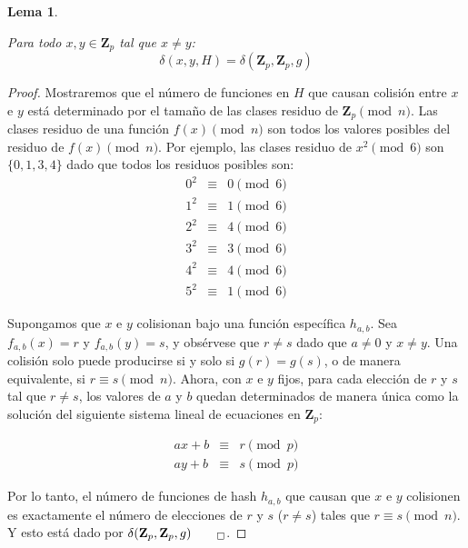 \documentclass[a4paper,10pt, oneside]{article}
\newtheorem{lemma}[theorem]{Lema}
\begin{document}
\begin{lemma}\label{lemma:pair_colisions}

	Para todo $x,y \in \mathbf{Z}_p$ tal que $x \neq y$:
	\begin{equation}
		\delta(x,y,H) = \delta(\mathbf{Z}_p,\mathbf{Z}_p,g)
	\end{equation}
\end{lemma}
\begin{proof}
	Mostraremos que el número de funciones en $H$ que causan colisión entre $x$ e $y$ está determinado por el tamaño de las clases residuo de $\mathbf{Z}_p \pmod{n}$. Las clases residuo de una función $f(x) \pmod{n}$ son todos los valores posibles del residuo de $f(x) \pmod{n}$. Por ejemplo, las clases residuo de $x^2 \pmod{6}$ son $\{ 0, 1, 3, 4 \}$ dado que todos los residuos posibles son:
	\begin{equation}
		\begin{array}{lll}
			0^2 & \equiv & 0 \pmod{6}\\		
			1^2 & \equiv & 1 \pmod{6}\\	
			2^2 & \equiv & 4 \pmod{6}\\	
			3^2 & \equiv & 3 \pmod{6}\\	
			4^2 & \equiv & 4 \pmod{6}\\	
			5^2 & \equiv & 1 \pmod{6}
		\end{array}
	\end{equation}
	
	Supongamos que $x$ e $y$ colisionan bajo una función específica $h_{a,b}$. Sea $f_{a,b}(x) = r$ y $f_{a,b}(y) = s$, y obsérvese que $r\neq s$ dado que $a \neq 0$ y $x \neq y$. Una colisión solo puede producirse si y solo si $g(r) = g(s)$, o de manera equivalente, si $r \equiv s \pmod{n}$. Ahora, con $x$ e $y$ fijos, para cada elección de $r$ y $s$ tal que $r \neq s$, los valores de $a$ y $b$ quedan determinados de manera única como la solución del siguiente sistema lineal de ecuaciones en $\mathbf{Z}_p$:
	
	\begin{equation}
		\begin{array}{lll}
			ax+b & \equiv & r \pmod{p} \\
			ay+b & \equiv & s \pmod{p}
		\end{array}
	\end{equation}
	
	Por lo tanto, el número de funciones de hash $h_{a,b}$ que causan que $x$ e $y$ colisionen es exactamente el número de elecciones de $r$ y $s$ ($r \neq s$) tales que $r \equiv s \pmod{n}$. Y esto está dado por $\delta(\mathbf{Z}_p,\mathbf{Z}_p,g)_{\qed}$.
\end{proof}
\
\end{document}
